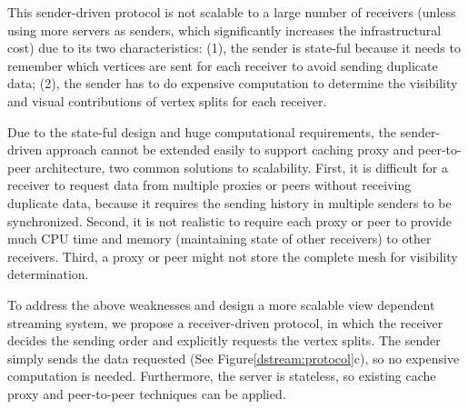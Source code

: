     This sender-driven protocol is not scalable to a large number 
    of receivers (unless using more servers as senders, 
    which significantly increases the infrastructural cost) 
    due to its two characteristics:
    (1), the sender is state-ful because it needs to remember which
    vertices are sent for each receiver to avoid sending duplicate data;
    (2), the sender has to do expensive computation to determine the 
    visibility and visual contributions of vertex splits for each receiver.
    
    Due to the state-ful design and huge computational requirements,
    the sender-driven approach cannot be extended easily to support 
    caching proxy and peer-to-peer architecture, two common solutions to scalability. 
    First, it is difficult for a receiver to request data from multiple proxies or peers
    without receiving duplicate data, because it requires the sending history in multiple senders to  
    be synchronized. 
    Second, it is not realistic to require each proxy or peer to provide much CPU
    time and memory (maintaining state of other receivers) to other receivers. 
    Third, a proxy or peer might not store the complete mesh for visibility determination.

    To address the above weaknesses and design a more scalable view dependent streaming system, 
    we propose a receiver-driven protocol, 
    in which the receiver decides the sending order and explicitly requests
    the vertex splits. The sender simply sends the data requested 
    (See Figure\ref{dstream:protocol}c), so no expensive computation is needed.
    Furthermore, the server is stateless, so
    existing cache proxy and peer-to-peer techniques can be applied.

    \begin{comment}
    The receiver-driven protocol also reduces the size of data sent by the sender.
    In sender-driven protocols, for each vertex split, the sender has to send identifications
    to indicate which vertex to be split ($V_s$ in Figure \ref{f:intro:split2}),
    requiring at least $log_2{n}$ bits if $n$ vertices exist \cite{258843}. 
    In the receiver-driven protocol, however, the sender needs not send
    these identifications since the vertex splits can be sent according to
    the requesting order from the receiver. The identifications, sent
    by the receiver, consumes the down-link bandwidth 
    of the sender, which is often less likely to be the bottleneck than the up-link.
    \end{comment}


